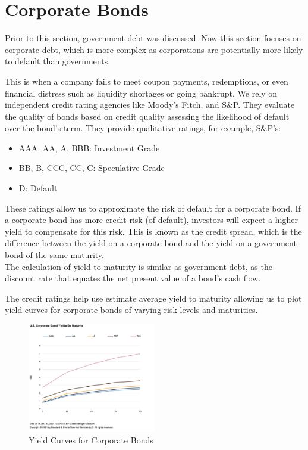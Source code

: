 \section{Corporate Bonds}
Prior to this section, government debt was discussed. Now this section focuses on corporate debt, which is more complex as corporations are potentially more likely to default than governments.

This is when a company fails to meet coupon payments, redemptions, or even financial distress such as liquidity shortages or going bankrupt. We rely on independent credit rating agencies like Moody's Fitch, and S\&P. They evaluate the quality of bonds based on credit quality assessing the likelihood of default over the bond's term. They provide qualitative ratings, for example, S\&P's:

\begin{itemize}
    \item AAA, AA, A, BBB: Investment Grade
    \item BB, B, CCC, CC, C: Speculative Grade
    \item D: Default
\end{itemize}

These ratings allow us to approximate the risk of default for a corporate bond. If a corporate bond has more credit risk (of default), investors will expect a higher yield to compensate for this risk. This is known as the credit spread, which is the difference between the yield on a corporate bond and the yield on a government bond of the same maturity.\\

The calculation of yield to maturity is similar as government debt, as the discount rate that equates the net present value of a bond's cash flow.

The credit ratings help use estimate average yield to maturity allowing us to plot yield curves for corporate bonds of varying risk levels and maturities.

\begin{figure}[H]
    \centering
    \includegraphics[width=0.5\textwidth]{img/2.6.png}
    \caption{Yield Curves for Corporate Bonds}
    \label{fig:corporate_yield_curve}
\end{figure}

